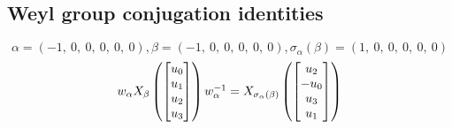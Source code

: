 \documentclass[11pt]{article}
\theoremstyle{definition}
\begin{document}
\subsection{Weyl group conjugation identities}

\providecommand{\scaletoalign}[2]{%
  \sbox0{$#2$}%
  \ifdim\wd0>#1\relax 
    \resizebox{#1}{!}{\usebox0}%
  \else 
    \usebox0%
  \fi 
}
\[
\alpha = \left( -1, \  0, \  0, \  0, \  0, \  0\right), \beta = \left( -1, \  0, \  0, \  0, \  0, \  0\right), \sigma_{\alpha}(\beta) = \left( 1, \  0, \  0, \  0, \  0, \  0\right)
\]
\[
\scaletoalign{\textwidth}{w_{\alpha} X_{\beta}\left(\left[\begin{matrix}u_{0}\\u_{1}\\u_{2}\\u_{3}\end{matrix}\right]\right) w_{\alpha}^{-1} = X_{\sigma_{\alpha}\left(\beta\right)}\left(\left[\begin{matrix}u_{2}\\- u_{0}\\u_{3}\\u_{1}\end{matrix}\right]\right)}
\]
\end{document}
